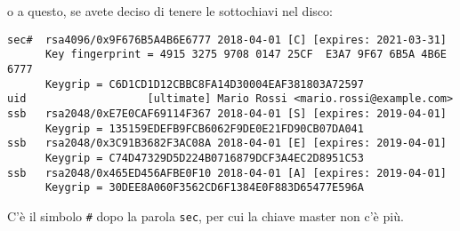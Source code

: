 o a questo, se avete deciso di tenere le sottochiavi nel disco:

\begin{lstlisting}
sec#  rsa4096/0x9F676B5A4B6E6777 2018-04-01 [C] [expires: 2021-03-31]
      Key fingerprint = 4915 3275 9708 0147 25CF  E3A7 9F67 6B5A 4B6E 6777
      Keygrip = C6D1CD1D12CBBC8FA14D30004EAF381803A72597
uid                   [ultimate] Mario Rossi <mario.rossi@example.com>
ssb   rsa2048/0xE7E0CAF69114F367 2018-04-01 [S] [expires: 2019-04-01]
      Keygrip = 135159EDEFB9FCB6062F9DE0E21FD90CB07DA041
ssb   rsa2048/0x3C91B3682F3AC08A 2018-04-01 [E] [expires: 2019-04-01]
      Keygrip = C74D47329D5D224B0716879DCF3A4EC2D8951C53
ssb   rsa2048/0x465ED456AFBE0F10 2018-04-01 [A] [expires: 2019-04-01]
      Keygrip = 30DEE8A060F3562CD6F1384E0F883D65477E596A
\end{lstlisting}


C'è il simbolo \texttt{\#} dopo la parola \texttt{sec}, per cui la chiave master
non c'è più.
